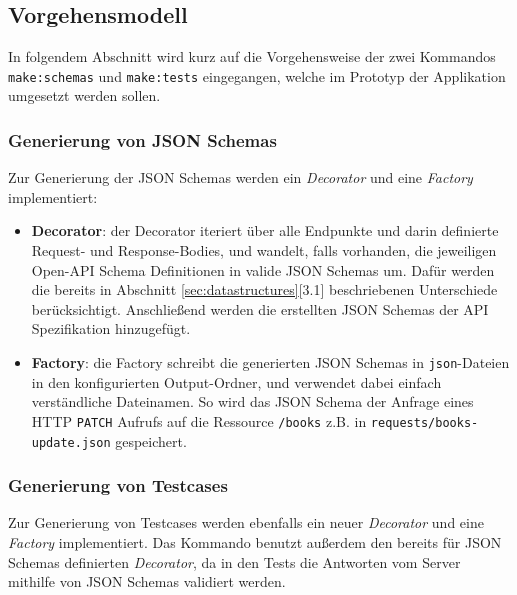 \subsection{Vorgehensmodell}
In folgendem Abschnitt wird kurz auf die Vorgehensweise der zwei Kommandos \lstinline|make:schemas| und \lstinline|make:tests| eingegangen, welche im Prototyp der Applikation umgesetzt werden sollen. 

\subsubsection{Generierung von JSON Schemas}
Zur Generierung der JSON Schemas werden ein \emph{Decorator} und eine \emph{Factory} implementiert:

\begin{itemize}
	\item \textbf{Decorator}: der Decorator iteriert über alle Endpunkte und darin definierte Request- und Response-Bodies, und wandelt, falls vorhanden, die jeweiligen Open-API Schema Definitionen in valide JSON Schemas um. Dafür werden die bereits in Abschnitt \ref{sec:datastructures}[3.1] beschriebenen Unterschiede berücksichtigt. Anschließend werden die erstellten JSON Schemas der API Spezifikation hinzugefügt.
	\item \textbf{Factory}: die Factory schreibt die generierten JSON Schemas in \lstinline|json|-Dateien in den konfigurierten Output-Ordner, und verwendet dabei einfach verständliche Dateinamen. So wird das JSON Schema der Anfrage eines HTTP \lstinline|PATCH| Aufrufs auf die Ressource \lstinline|/books| z.B. in \lstinline|requests/books-update.json| gespeichert.
\end{itemize}

\subsubsection{Generierung von Testcases}
Zur Generierung von Testcases werden ebenfalls ein neuer \emph{Decorator} und eine \emph{Factory} implementiert. Das Kommando benutzt außerdem den bereits für JSON Schemas definierten \emph{Decorator}, da in den Tests die Antworten vom Server mithilfe von JSON Schemas validiert werden.

